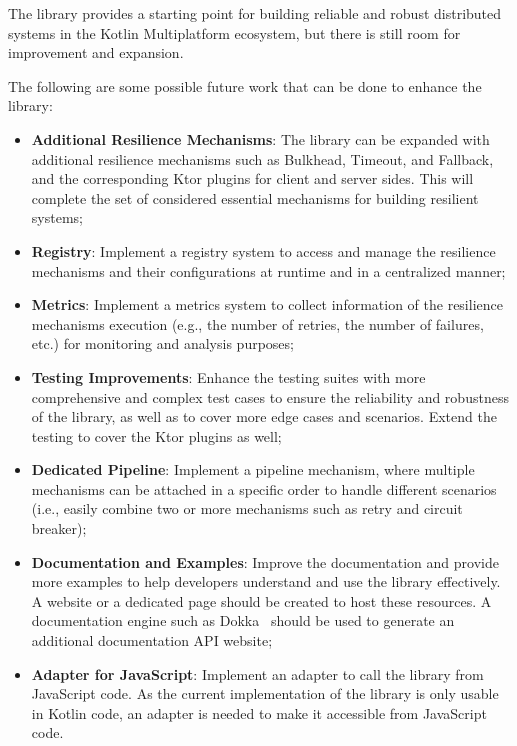 The library provides a starting point for building reliable and robust distributed systems in the Kotlin Multiplatform ecosystem, but there is still room for improvement and expansion.

The following are some possible future work that can be done to enhance the library:

\begin{itemize}
    \item \textbf{Additional Resilience Mechanisms}: The library can be expanded with additional resilience mechanisms such as Bulkhead,
    Timeout, and Fallback, and the corresponding Ktor plugins for client and server sides.
    This will complete the set of considered essential mechanisms for building resilient systems;
    \item \textbf{Registry}:
    Implement a registry system
    to access and manage the resilience mechanisms and their configurations at runtime and in a centralized manner;
    \item \textbf{Metrics}:
    Implement a metrics system to collect information of the resilience mechanisms execution (e.g., the number of retries, the number of failures, etc.) for monitoring and analysis purposes;
    \item \textbf{Testing Improvements}:
    Enhance the testing suites with more comprehensive and complex test cases
    to ensure the reliability and robustness of the library, as well as to cover more edge cases and scenarios.
    Extend the testing to cover the Ktor plugins as well;
    \item \textbf{Dedicated Pipeline}:
    Implement a pipeline mechanism,
    where multiple mechanisms can be attached in a specific order to handle different scenarios (i.e., easily combine two or more mechanisms such as retry and circuit breaker);
    \item \textbf{Documentation and Examples}:
    Improve the documentation
    and provide more examples to help developers understand and use the library effectively.
    A website or a dedicated page should be created
    to host these resources.
    A documentation engine such as Dokka~\cite{dokka} should be used to generate an additional documentation API website;
    \item \textbf{Adapter for JavaScript}: Implement an adapter to call the library from JavaScript code.
    As the current implementation of the library is only usable in Kotlin code, an adapter is needed to make it accessible from JavaScript code.
\end{itemize}
